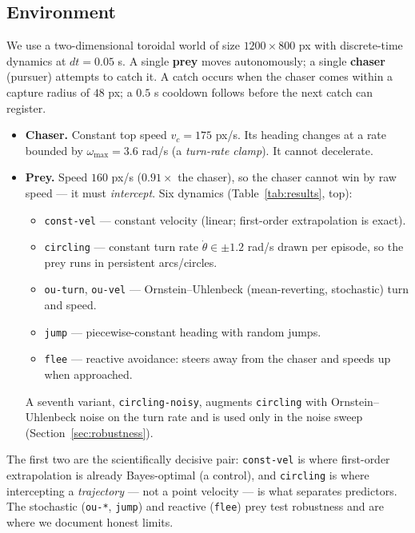 \documentclass[11pt]{article}
\begin{document}
\subsection{Environment}

We use a two-dimensional toroidal world of size $1200 \times 800$ px with discrete-time
dynamics at $dt = 0.05$ s. A single \textbf{prey} moves autonomously; a single \textbf{chaser}
(pursuer) attempts to catch it. A catch occurs when the chaser comes within a capture radius of
$48$ px; a $0.5$ s cooldown follows before the next catch can register.

\begin{itemize}
\item \textbf{Chaser.} Constant top speed $v_c = 175$ px/s. Its heading changes at a rate
  bounded by $\omega_{\max} = 3.6$ rad/s (a \emph{turn-rate clamp}). It cannot decelerate.
\item \textbf{Prey.} Speed $160$ px/s ($0.91\times$ the chaser), so the chaser cannot win by
  raw speed --- it must \emph{intercept}. Six dynamics (Table~\ref{tab:results}, top):
  \begin{itemize}
  \item \texttt{const-vel} --- constant velocity (linear; first-order extrapolation is exact).
  \item \texttt{circling} --- constant turn rate $\dot\theta \in \pm 1.2$ rad/s drawn per
    episode, so the prey runs in persistent arcs/circles.
  \item \texttt{ou-turn}, \texttt{ou-vel} --- Ornstein--Uhlenbeck (mean-reverting, stochastic)
    turn and speed.
  \item \texttt{jump} --- piecewise-constant heading with random jumps.
  \item \texttt{flee} --- reactive avoidance: steers away from the chaser and speeds up when
    approached.
  \end{itemize}
A seventh variant, \texttt{circling-noisy}, augments \texttt{circling} with
Ornstein--Uhlenbeck noise on the turn rate and is used only in the noise sweep
(Section~\ref{sec:robustness}).
\end{itemize}

The first two are the scientifically decisive pair: \texttt{const-vel} is where first-order
extrapolation is already Bayes-optimal (a control), and \texttt{circling} is where intercepting
a \emph{trajectory} --- not a point velocity --- is what separates predictors. The stochastic
(\texttt{ou-*}, \texttt{jump}) and reactive (\texttt{flee}) prey test robustness and are where
we document honest limits.
\end{document}

